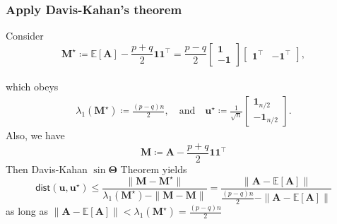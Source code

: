 \documentclass[compress,
mathserif,wide,%
]{beamer}
\begin{document}
\begin{frame}
\frametitle{Apply Davis-Kahan's theorem}
Consider 
\[
\bm{M}^{\star}\coloneqq\mathbb{E}[\bm{A}]-\frac{p+q}{2}\bm{1}\bm{1}^{\top}=\frac{p-q}{2}\left[\begin{array}{c}
\bm{1}\\
-\bm{1}
\end{array}\right]\left[\begin{array}{cc}
\bm{1}^{\top} & -\bm{1}^{\top}\end{array}\right], 
\] \\
which obeys 
\begin{align*}
	\lambda_{1}(\bm{M}^{\star})\coloneqq\frac{(p-q)n}{2},  
	\quad \text{and} \quad
	\bm{u}^{\star}  \coloneqq \frac{1}{\sqrt{n}}
	\left[\begin{array}{c}
		\bm{1}_{n/2}\\
		-\bm{1}_{n/2}
	\end{array}\right].
\end{align*}
Also, we have 
\[
\bm{M}\coloneqq \bm{A}-\frac{p+q}{2}\bm{1}\bm{1}^{\top}
\]
\vfill
Then Davis-Kahan $\sin\bm{\Theta}$ Theorem yields
%
\begin{equation}
	\label{eq:DK-SBM}
	\mathsf{dist}( {\bm{u}}, \bm{u}^{\star}) \leq\frac{\|{\bm{M}} - \bm{M}^{\star}\|}{\lambda_{1}(\bm{M}^{\star})-\|{\bm{M}} - \bm{M}\|}=\frac{\|\bm{A}-\mathbb{E}[\bm{A}]\|}{\frac{(p-q)n}{2}-\|\bm{A}-\mathbb{E}[\bm{A}]\|}
\end{equation}
as long as $\|\bm{A}-\mathbb{E}[\bm{A}]\| < \lambda_{1}(\bm{M}^{\star})=\frac{(p-q)n}{2}$
%
%
%

	
\end{frame}
\end{document}
